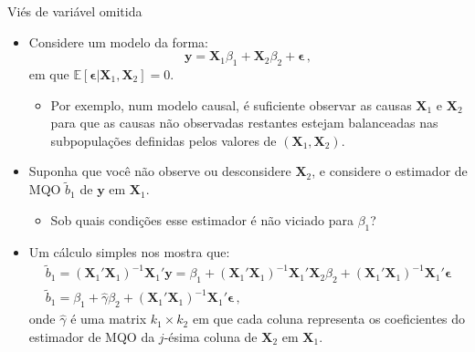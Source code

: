 \documentclass[11pt]{beamer}
\begin{document}
\begin{frame}{Viés de variável omitida}
\begin{itemize}
	\item Considere um modelo da forma:
	$$\boldsymbol{y}= \boldsymbol{X}_1 \beta_1 + \boldsymbol{X}_2 \beta_2 + \boldsymbol{\epsilon}\, ,$$
	em que $\mathbb{E}[\boldsymbol{\epsilon}|\boldsymbol{X}_1,\boldsymbol{X}_2] = 0$. 
	\begin{itemize}
		\item Por exemplo, num modelo causal, é suficiente observar as causas $\boldsymbol{X}_1$ e $\boldsymbol{X}_2$ para que as causas não observadas restantes estejam balanceadas nas subpopulações definidas pelos valores de $(\boldsymbol{X}_1,\boldsymbol{X}_2)$.
	\end{itemize}
	\item Suponha que você {\color{red}não observe ou desconsidere} $\boldsymbol{X}_2$, e considere o estimador de MQO $\tilde{b}_1$ de $\boldsymbol{y}$ em $\boldsymbol{X}_1$.
	\begin{itemize}
		\item Sob quais condições esse estimador é não viciado para $\beta_1$?
	\end{itemize}
	\item Um cálculo simples nos mostra que:
	\begin{equation*}
		\begin{aligned}
		\tilde{b}_1 = (\boldsymbol{X}_1'\boldsymbol{X}_1)^{-1}\boldsymbol{X}_1'\boldsymbol{y} = \beta_1 + (\boldsymbol{X}_1'\boldsymbol{X}_1)^{-1}\boldsymbol{X}_1' \boldsymbol{X}_2 \beta_2 +(\boldsymbol{X}_1'\boldsymbol{X}_1)^{-1}\boldsymbol{X}_1'\boldsymbol{\epsilon}  \\
		\tilde{b}_1 = \beta_1 + \hat{\gamma}\beta_2 + (\boldsymbol{X}_1'\boldsymbol{X}_1)^{-1}\boldsymbol{X}_1'\boldsymbol{\epsilon} \, ,
		\end{aligned}
	\end{equation*}
	onde $\hat{\gamma}$ é uma matrix $k_1\times k_2$ em que cada coluna representa os coeficientes do estimador de MQO da $j$-ésima coluna de $\boldsymbol{X}_2$ em $\boldsymbol{X}_1$.
	
\end{itemize}
\end{frame}
\end{document}
